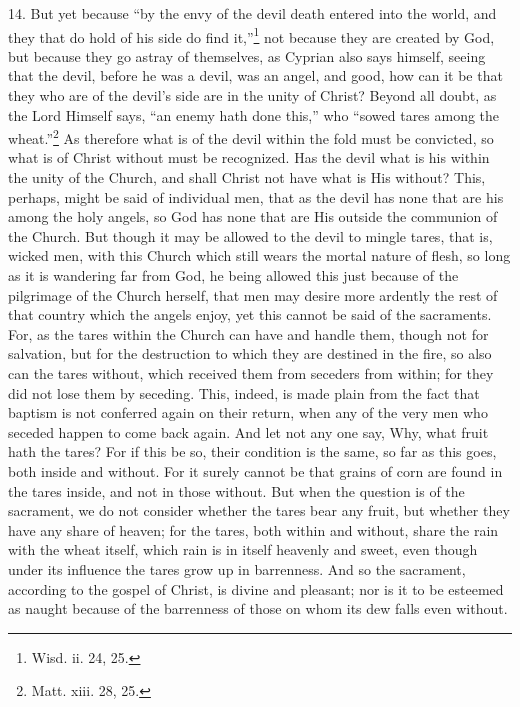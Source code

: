 14. But yet because ``by the envy of the devil death entered into the world, and they that do hold of his side do find it,''\footnote{\par  Wisd. ii. 24, 25.} not because they are created by God, but because they go astray of themselves, as Cyprian also says himself, seeing that the devil, before he was a devil, was an angel, and good, how can it be that they who are of the devil’s side are in the unity of Christ? Beyond all doubt, as the Lord Himself says, ``an enemy hath done this,'' who ``sowed tares among the wheat.''\footnote{\par  Matt. xiii. 28, 25.} As therefore what is of the devil within the fold must be convicted, so what is of Christ without must be recognized. Has the devil what is his within the unity of the Church, and shall Christ not have what is His without? This, perhaps, might be said of individual men, that as the devil has none that are his among the holy angels, so God has none that are His outside the communion of the Church. But though it may be allowed to the devil to mingle tares, that is, wicked men, with this Church which still wears the mortal nature of flesh, so long as it is wandering far from God, he being allowed this just because of the pilgrimage of the Church herself, that men may desire more ardently the rest of that country which the angels enjoy, yet this cannot be said of the sacraments. For, as the tares within the Church can have and handle them, though not for salvation, but for the destruction to which they are destined in the fire, so also can the tares without, which received them from seceders from within; for they did not lose them by seceding. This, indeed, is made plain from the fact that baptism is not conferred again on their return, when any of the very men who seceded happen to come back again. And let not any one say, Why, what fruit hath the tares? For if this be so, their condition is the same, so far as this goes, both inside and without. For it surely cannot be that grains of corn are found in the tares inside, and not in those without. But when the question is of the sacrament, we do not consider whether the tares bear any fruit, but whether they have any share of heaven; for the tares, both within and without, share the rain with the wheat itself, which rain is in itself heavenly and sweet, even though under its influence the tares grow up in barrenness. And so the sacrament, according to the gospel of Christ, is divine and pleasant; nor is it to be esteemed as naught because of the barrenness of those on whom its dew falls even without.

